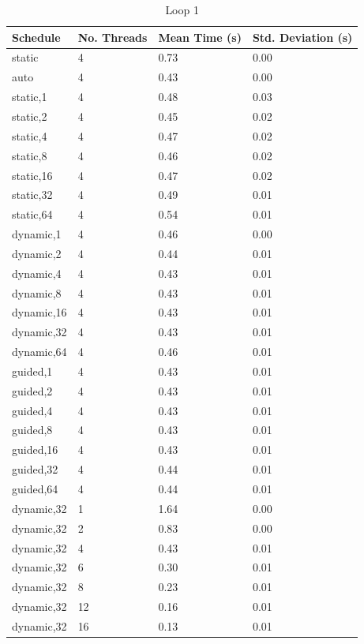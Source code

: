 \documentclass[a4paper,12pt]{article}
\begin{document}
\begin {table}[H]
\caption {Loop 1}
\small
\center
\begin{tabular}{ | l | l | l | l | }
\hline
	Schedule &  No. Threads &  Mean Time (s) &  Std. Deviation (s) \\ \hline
	static & 4 & 0.73 & 0.00 \\ 
	auto & 4 & 0.43 & 0.00 \\ 
	static,1 & 4 & 0.48 & 0.03 \\ 
	static,2 & 4 & 0.45 & 0.02 \\ 
	static,4 & 4 & 0.47 & 0.02 \\ 
	static,8 & 4 & 0.46 & 0.02 \\ 
	static,16 & 4 & 0.47 & 0.02 \\ 
	static,32 & 4 & 0.49 & 0.01 \\ 
	static,64 & 4 & 0.54 & 0.01 \\ 
	dynamic,1 & 4 & 0.46 & 0.00 \\
	dynamic,2 & 4 & 0.44 & 0.01 \\
	dynamic,4 & 4 & 0.43 & 0.01 \\
	dynamic,8 & 4 & 0.43 & 0.01 \\
	dynamic,16 & 4 & 0.43 & 0.01 \\
	dynamic,32 & 4 & 0.43 & 0.01 \\
	dynamic,64 & 4 & 0.46 & 0.01 \\
	guided,1 & 4 & 0.43 & 0.01 \\
	guided,2 & 4 & 0.43 & 0.01 \\
	guided,4 & 4 & 0.43 & 0.01 \\ 
	guided,8 & 4 & 0.43 & 0.01 \\ 
	guided,16 & 4 & 0.43 & 0.01 \\
	guided,32 & 4 & 0.44 & 0.01 \\ 
	guided,64 & 4 & 0.44 & 0.01 \\ 
	dynamic,32 & 1 & 1.64 & 0.00 \\ 
	dynamic,32 & 2 & 0.83 & 0.00 \\ 
	dynamic,32 & 4 & 0.43 & 0.01 \\ 
	dynamic,32 & 6 & 0.30 & 0.01 \\ 
	dynamic,32 & 8 & 0.23 & 0.01 \\ 
	dynamic,32 & 12 & 0.16 & 0.01 \\ 
	dynamic,32 & 16 & 0.13 & 0.01 \\ \hline
\end{tabular}
\end{table}
\end{document}
